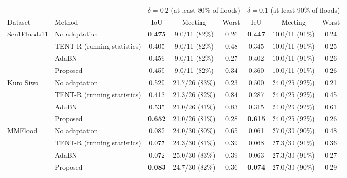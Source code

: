 \begin{tabular}{llcccccc}
\toprule
 & & \multicolumn{3}{c}{$\delta=0.2$ (at least 80\% of floods)} & \multicolumn{3}{c}{$\delta=0.1$ (at least 90\% of floods)} \\
\cmidrule(lr){3-5}\cmidrule(lr){6-8}
Dataset & Method & IoU & Meeting & Worst & IoU & Meeting & Worst \\
\midrule
Sen1Floods11 & No adaptation & \textbf{0.475} & 9.0/11 (82\%) & 0.26 & \textbf{0.447} & 10.0/11 (91\%) & 0.24 \\
 & TENT-R (running statistics) & 0.405 & 9.0/11 (82\%) & 0.48 & 0.345 & 10.0/11 (91\%) & 0.25 \\
 & AdaBN & 0.459 & 9.0/11 (82\%) & 0.27 & 0.402 & 10.0/11 (91\%) & 0.26 \\
 & Proposed & 0.459 & 9.0/11 (82\%) & 0.34 & 0.360 & 10.0/11 (91\%) & 0.26 \\
\midrule
Kuro Siwo & No adaptation & 0.529 & 21.7/26 (83\%) & 0.23 & 0.500 & 24.0/26 (92\%) & 0.21 \\
 & TENT-R (running statistics) & 0.413 & 21.3/26 (82\%) & 0.84 & 0.287 & 24.0/26 (92\%) & 0.45 \\
 & AdaBN & 0.535 & 21.0/26 (81\%) & 0.83 & 0.315 & 24.0/26 (92\%) & 0.61 \\
 & Proposed & \textbf{0.652} & 21.0/26 (81\%) & 0.28 & \textbf{0.615} & 24.0/26 (92\%) & 0.26 \\
\midrule
MMFlood & No adaptation & 0.082 & 24.0/30 (80\%) & 0.65 & 0.061 & 27.0/30 (90\%) & 0.48 \\
 & TENT-R (running statistics) & 0.077 & 24.3/30 (81\%) & 0.39 & 0.068 & 27.3/30 (91\%) & 0.36 \\
 & AdaBN & 0.072 & 25.0/30 (83\%) & 0.39 & 0.063 & 27.3/30 (91\%) & 0.27 \\
 & Proposed & \textbf{0.083} & 24.7/30 (82\%) & 0.36 & \textbf{0.074} & 27.0/30 (90\%) & 0.29 \\
\bottomrule
\end{tabular}
